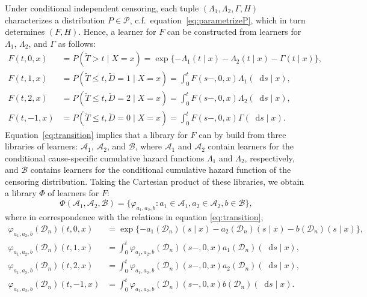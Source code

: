 \documentclass[alpha-refs]{wiley-article}
\renewcommand{\phi}{\varphi}
\newcommand*\diff{\mathop{}\!\mathrm{d}}
\newcommand{\1}{\mathbb{1}} %
\newcommand{\data}{\ensuremath{\mathcal{D}}}
\begin{document}
Under conditional independent censoring, each tuple
$(\Lambda_{1}, \Lambda_{2}, \Gamma, H)$ characterizes a distribution
\(P\in\mathcal P\), c.f.\ equation~\eqref{eq:parametrizeP}, which in
turn determines \( (F, H) \). Hence, a learner for \( F \) can be
constructed from learners for \( \Lambda_1 \), \( \Lambda_2 \), and
$\Gamma$ as follows:
\begin{equation}\label{eq:transition}
  \begin{split}
    F(t, 0, x)
    &
      = P(\tilde{T} > t \mid X= x)
      =
      \exp{{\{-\Lambda_{1}(t \mid x)-\Lambda_{2}(t \mid x) - \Gamma(t \mid x)\}
      }},
    \\
    F(t, 1, x)
    &
      = P(\tilde{T} \leq t, \tilde{D}=1 \mid X=x)
      = \int_0^t F(s-, 0, x)  \Lambda_{1}(\diff s \mid x),
    \\
    F(t, 2, x)
    &
      = P(\tilde{T} \leq t, \tilde{D}=2 \mid X=x)
      = \int_0^t  F(s-, 0, x)  \Lambda_{2}(\diff s \mid x),
    \\
    F(t, -1, x)
    &
      = P(\tilde{T} \leq t, \tilde{D}=0 \mid X=x)
      = \int_0^t F(s-, 0, x)  \Gamma(\diff s \mid x).
  \end{split}
\end{equation}
Equation~\eqref{eq:transition} implies that a library for \( F \) can
by build from three libraries of learners: \(\mathcal{A}_1\),
\( \mathcal{A}_2 \), and \( \mathcal{B} \), where \(\mathcal{A}_1\)
and \( \mathcal{A}_2\) contain learners for the conditional
cause-specific cumulative hazard functions \(\Lambda_1\) and
\( \Lambda_2\), respectively, and \(\mathcal{B}\) contains learners
for the conditional cumulative hazard function of the censoring
distribution.  Taking the Cartesian product of these libraries, we
obtain a library $\Phi$ of learners for \( F \):
\begin{equation}
  \label{eq:jssl-lib-def}
  \Phi(\mathcal{A}_1, \mathcal{A}_2, \mathcal{B})
  = \{ \phi_{a_1,a_2, b} : a_1 \in \mathcal{A}_1, a_2 \in \mathcal{A}_2, b \in \mathcal{B}\},
\end{equation}
where in correspondence with the relations in equation
\eqref{eq:transition},
\begin{equation}
  \begin{split}\label{eq:anti-transition}
    \phi_{a_1,a_2, b}(\data_n)(t,0,x)
  &= \exp{\{-a_1(\data_n)(s \mid x)-a_2(\data_n)(s \mid x) - b(\data_n)(s \mid
    x)\} },
  \\
  \phi_{a_1,a_2, b}(\data_n)(t,1,x)
  &= \int_0^t
    \phi_{a_1,a_2, b}(\data_n)(s-,0,x)  a_1(\data_n)(\diff s \mid x),
  \\
  \phi_{a_1,a_2, b}(\data_n)(t,2,x)
  &= \int_0^t\phi_{a_1,a_2, b}(\data_n)(s-,0,x)  a_2(\data_n)(\diff s \mid x),
  \\
  \phi_{a_1,a_2, b}(\data_n)(t,-1,x)
  &= \int_0^t \phi_{a_1,a_2, b}(\data_n)(s-,0,x)  b(\data_n)(\diff s \mid x).
  \end{split}
\end{equation}
\end{document}
